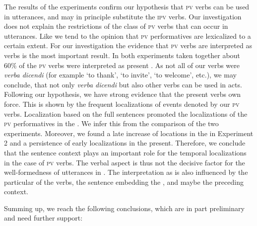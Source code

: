 \documentclass[output=paper,colorlinks,citecolor=brown,newtxmath,hidelinks]{langscibook}
\begin{document}
The results of the experiments confirm our hypothesis that \textsc{pv}  verbs can be used in  utterances, and may in principle substitute the \textsc{ipv}  verbs. Our investigation does not explain the restrictions of the class of \textsc{pv} verbs that can occur in  utterances. Like \citet{Wiemer2014} we tend to the opinion that \textsc{pv} performatives are lexicalized to a certain extent. For our investigation the evidence that \textsc{pv}  verbs are interpreted as  verbs is the most important result. In both experiments taken together about $60\%$ of the \textsc{pv}  verbs were interpreted as present . As not all of our  verbs were \textit{verba dicendi} (for example ‘to thank’, ‘to invite’, ‘to welcome’, etc.), we may conclude, that not only \textit{verba dicendi} but also other  verbs can be used in  acts. Following our hypothesis, we have strong evidence that the present   verbs own  force. This is shown by the frequent  localizations of events denoted by our \textsc{pv}  verbs. Localization based on the full sentences promoted the localizations of the \textsc{pv} performatives in the . We infer this from the comparison of the two experiments. Moreover, we found a late increase of locations in the  in Experiment 2 and a persistence of early localizations in the present. Therefore, we conclude that the sentence context plays an important role for the temporal localizations in the case of \textsc{pv}  verbs. The verbal aspect is thus not the decisive factor for the well-formedness of  utterances in . The interpretation as  is also influenced by the particular  of the  verbs, the sentence embedding the , and maybe the preceding context.

Summing up, we reach the following conclusions, which are in part preliminary and need further support:
\end{document}
